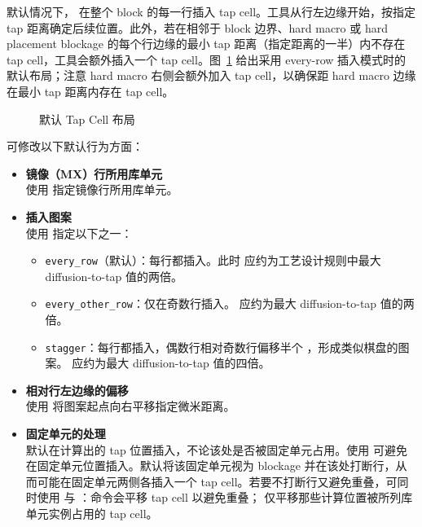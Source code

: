 默认情况下， 在整个 block 的每一行插入 tap cell。工具从行左边缘开始，按指定 tap 距离确定后续位置。此外，若在相邻于 block 边界、hard macro 或 hard placement blockage 的每个行边缘的最小 tap 距离（指定距离的一半）内不存在 tap cell，工具会额外插入一个 tap cell。图~\ref{fig:default-tap-placement} 给出采用 every-row 插入模式时的默认布局；注意 hard macro 右侧会额外加入 tap cell，以确保距 hard macro 边缘在最小 tap 距离内存在 tap cell。

\begin{figure}[htbp]
\centering
{}
\caption{默认 Tap Cell 布局}
\label{fig:default-tap-placement}
\end{figure}

可修改以下默认行为方面：
\begin{itemize}
  \item \textbf{镜像（MX）行所用库单元}\\
        使用  指定镜像行所用库单元。
  \item \textbf{插入图案}\\
        使用  指定以下之一：
        \begin{itemize}
          \item \texttt{every\_row}（默认）：每行都插入。此时  应约为工艺设计规则中最大 diffusion-to-tap 值的两倍。
          \item \texttt{every\_other\_row}：仅在奇数行插入。 应约为最大 diffusion-to-tap 值的两倍。
          \item \texttt{stagger}：每行都插入，偶数行相对奇数行偏移半个 ，形成类似棋盘的图案。 应约为最大 diffusion-to-tap 值的四倍。
        \end{itemize}
  \item \textbf{相对行左边缘的偏移}\\
        使用  将图案起点向右平移指定微米距离。
  \item \textbf{固定单元的处理}\\
        默认在计算出的 tap 位置插入，不论该处是否被固定单元占用。使用  可避免在固定单元位置插入。默认将该固定单元视为 blockage 并在该处打断行，从而可能在固定单元两侧各插入一个 tap cell。若要不打断行又避免重叠，可同时使用  与 ：命令会平移 tap cell 以避免重叠； 仅平移那些计算位置被所列库单元实例占用的 tap cell。
\end{itemize}


